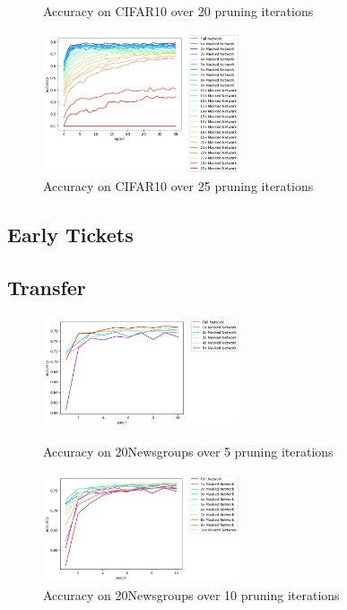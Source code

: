 \begin{figure}
\begin{minipage}{0.5\textwidth}
		\caption*{Accuracy on CIFAR10 over 20 pruning iterations}
		\label{fig:CIFAR10accuracy20}
	\end{minipage}\hfill
	\begin{minipage}{0.5\textwidth}
		\centering
		\includegraphics[width=220px]{gfx/Experiments/Reproduction-CIFAR10-CNN/accuracy/25_iterations.png}
		\caption*{Accuracy on CIFAR10 over 25 pruning iterations}
		\label{fig:CIFAR10accuracy25}
	\end{minipage}
\end{figure}
\subsection*{Early Tickets}
\subsection*{Transfer}
\begin{figure}
	\begin{minipage}{0.5\textwidth}
		\centering
		\includegraphics[width=220px]{gfx/Experiments/Transfer-20Newsgroups-CNN/accuracy/5_iterations.png}
		\caption*{Accuracy on 20Newsgroups over 5 pruning iterations}
		\label{fig:CIFAR10accuracy10}
	\end{minipage}\hfill
	\begin{minipage}{0.5\textwidth}
		\centering
		\includegraphics[width=220px]{gfx/Experiments/Transfer-20Newsgroups-CNN/accuracy/10_iterations.png}
		\caption*{Accuracy on 20Newsgroups over 10 pruning iterations}
		\label{fig:CIFAR10accuracy15}
	\end{minipage}
\end{figure}

